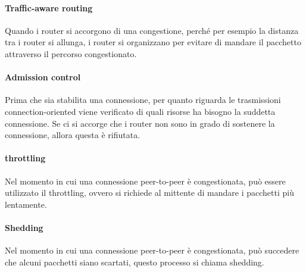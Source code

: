 \documentclass{article}
\begin{document}
\paragraph{Traffic-aware routing}
Quando i router si accorgono di una congestione, perché per esempio la distanza
tra i router si allunga, i router si organizzano per evitare di mandare il
pacchetto attraverso il percorso congestionato.\\

\paragraph{Admission control}
Prima che sia stabilita una connessione, per quanto riguarda le trasmissioni
connection-oriented viene verificato di quali risorse ha bisogno la suddetta
connessione. Se ci si accorge che i router non sono in grado di sostenere la
connessione, allora questa è rifiutata.\\

\paragraph{throttling}
Nel momento in cui una connessione peer-to-peer è congestionata, può essere
utilizzato il throttling, ovvero si richiede al mittente di mandare i pacchetti
più lentamente. 

\paragraph{Shedding}
Nel momento in cui una connessione peer-to-peer è congestionata, può succedere
che alcuni pacchetti siano scartati, questo processo si chiama shedding.\\
\end{document}
